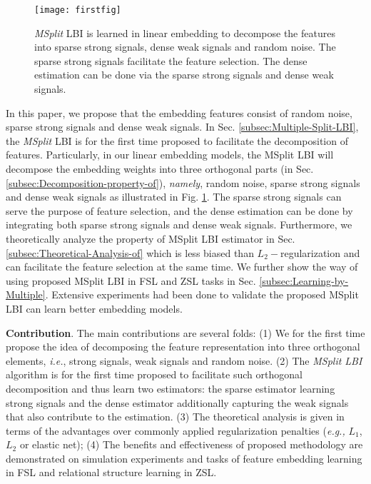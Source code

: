 \documentclass{article}
\begin{document}
\begin{figure}[t]
\centering{}\texttt{[image: firstfig]}
\caption{\emph{MSplit} LBI is learned in linear embedding to decompose the
features into sparse strong signals, dense weak signals and random
noise. The sparse strong signals facilitate the feature selection.
The dense estimation can be done via the sparse strong signals and
dense weak signals.}
\label{figure:simulation}
\end{figure}


In this paper, we propose that the embedding features consist of random
noise, sparse strong signals and dense weak signals. In Sec. \ref{subsec:Multiple-Split-LBI},
the \emph{MSplit} LBI is for the first time proposed to facilitate
the decomposition of features. Particularly, in our linear embedding
models, the  {MSplit} LBI will decompose
the embedding weights into three orthogonal parts (in Sec.\ref{subsec:Decomposition-property-of}),
\emph{namely}, random noise, sparse strong signals and dense weak
signals as illustrated in Fig. \ref{figure:simulation}. The sparse
strong signals can serve the purpose of feature selection, and the
dense estimation can be done by integrating both sparse strong signals and dense weak
signals. Furthermore, we theoretically analyze the property of  {MSplit}
LBI estimator in Sec. \ref{subsec:Theoretical-Analysis-of} which
is less biased than $L_{2}-$regularization and can facilitate the
feature selection at the same time. We further show the way of using
proposed  {MSplit} LBI in FSL and ZSL tasks in Sec. \ref{subsec:Learning-by-Multiple}.
Extensive experiments had been done to validate the proposed  {MSplit}
LBI can learn better embedding models.




\noindent \textbf{Contribution}. The main contributions are several
folds: (1) We for the first time propose the idea of decomposing the
feature representation into three orthogonal elements, \emph{i.e.},
strong signals, weak signals and random noise. (2) The \emph{MSplit
LBI} algorithm is for the first time proposed to facilitate such orthogonal
decomposition and thus learn two estimators: the sparse estimator
learning strong signals and the dense estimator additionally capturing
the weak signals that also contribute to the estimation.
(3) The theoretical analysis is given in terms of the advantages
over commonly applied regularization penalties (\emph{e.g.,} $L_{1}$,
$L_{2}$ or elastic net); (4) The benefits and effectiveness of proposed
methodology are demonstrated on simulation experiments and tasks of
feature embedding learning in FSL and relational structure learning
in ZSL.
\end{document}
